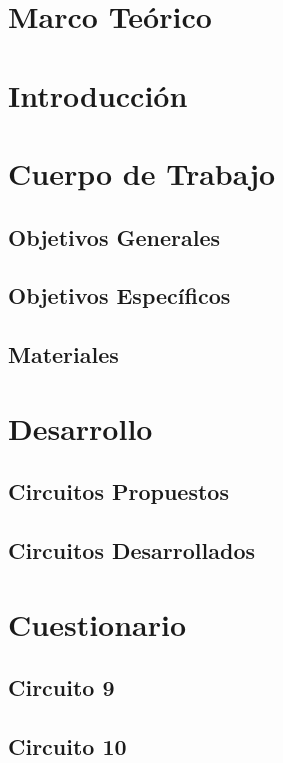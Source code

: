 \documentclass{extbook}
\begin{document}

\tableofcontents
\listoffigures
\chapter{Marco Teórico}

\chapter{Introducción}

\chapter{Cuerpo de Trabajo}
\section{Objetivos Generales}

\section{Objetivos Específicos}

\section{Materiales}

\chapter{Desarrollo}
\section{Circuitos Propuestos}

\section{Circuitos Desarrollados}

\chapter{Cuestionario}
\section{Circuito 9}

\section{Circuito 10}

\end{document}
